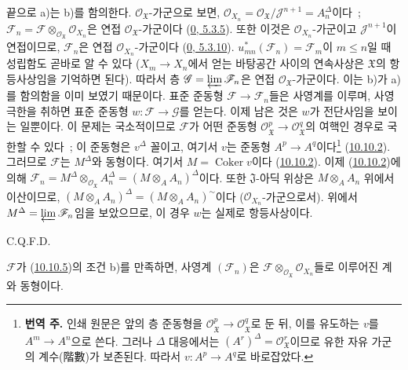 끝으로 a)는 b)를 함의한다. $\mathscr{O}_{\mathfrak{X}}$-가군으로
보면,
$\mathscr{O}_{X_n}=\mathscr{O}_{\mathfrak{X}}/
\mathscr{J}^{n+1}=A_n^\Delta$이다~; $\mathscr{F}_n=\mathscr{F}
\otimes_{\mathscr{O}_{\mathfrak{X}}}\mathscr{O}_{X_n}$은 연접
$\mathscr{O}_{\mathfrak{X}}$-가군이다
(\hyperref[0.5.3.5-ko]{0, 5.3.5}). 또한 이것은
$\mathscr{O}_{X_n}$-가군이고 $\mathscr{J}^{n+1}$이 연접이므로,
$\mathscr{F}_n$은 연접 $\mathscr{O}_{X_n}$-가군이다
(\hyperref[0.5.3.10-ko]{0, 5.3.10}).
$u_{mn}^*(\mathscr{F}_n)=\mathscr{F}_m$이 $m\leq n$일 때 성립함도
곧바로 알 수 있다
($X_m\to X_n$에서 얻는 바탕공간 사이의 연속사상은
$\mathfrak{X}$의 항등사상임을 기억하면 된다). 따라서 층
$\mathscr{G}=\varprojlim\mathscr{F}_n$은 연접
$\mathscr{O}_{\mathfrak{X}}$-가군이다. 이는 b)가 a)를 함의함을 이미
보였기 때문이다. 표준 준동형 $\mathscr{F}\to\mathscr{F}_n$들은
사영계를 이루며, 사영극한을 취하면 표준 준동형
$w:\mathscr{F}\to\mathscr{G}$를 얻는다. 이제 남은 것은 $w$가 전단사임을
보이는 일뿐이다. 이 문제는 국소적이므로 $\mathscr{F}$가 어떤 준동형
$\mathscr{O}_{\mathfrak{X}}^p\to\mathscr{O}_{\mathfrak{X}}^q$의
여핵인 경우로 국한할 수 있다~; 이 준동형은 $v^\Delta$ 꼴이고, 여기서
$v$는 준동형 $A^p\to A^q$이다\footnote{\textbf{번역 주.} 인쇄 원문은
앞의 층 준동형을
$\mathscr{O}_{\mathfrak{X}}^p\to\mathscr{O}_{\mathfrak{X}}^q$로
둔 뒤, 이를 유도하는 $v$를 $A^m\to A^n$으로 쓴다. 그러나
$\Delta$ 대응에서는 $(A^r)^\Delta=\mathscr{O}_{\mathfrak{X}}^r$이므로
유한 자유 가군의 계수(階數)가 보존된다. 따라서 $v:A^p\to A^q$로
바로잡았다.}
(\hyperref[I.10.10.2-ko]{10.10.2}). 그러므로 $\mathscr{F}$는
$M^\Delta$와 동형이다. 여기서 $M=\operatorname{Coker}v$이다
(\hyperref[I.10.10.2-ko]{10.10.2}). 이제
(\hyperref[I.10.10.2-ko]{10.10.2})에 의해
$\mathscr{F}_n=M^\Delta\otimes_{\mathscr{O}_{\mathfrak{X}}}A_n^\Delta
=(M\otimes_A A_n)^\Delta$이다. 또한 $\mathfrak{J}$-아딕 위상은
$M\otimes_A A_n$ 위에서 이산이므로,
$(M\otimes_A A_n)^\Delta=(M\otimes_A A_n)^{\sim}$이다
($\mathscr{O}_{X_n}$-가군으로서). 위에서
$M^\Delta=\varprojlim\mathscr{F}_n$임을 보았으므로, 이 경우 $w$는
실제로 항등사상이다.
\par\hfill C.Q.F.D.\par

\begin{corollary}[10.10.6]
\label{I.10.10.6-ko}
$\mathscr{F}$가 (\hyperref[I.10.10.5-ko]{10.10.5})의 조건 b)를
만족하면, 사영계 $(\mathscr{F}_n)$은
$\mathscr{F}\otimes_{\mathscr{O}_{\mathfrak{X}}}\mathscr{O}_{X_n}$들로
이루어진 계와 동형이다.
\end{corollary}

